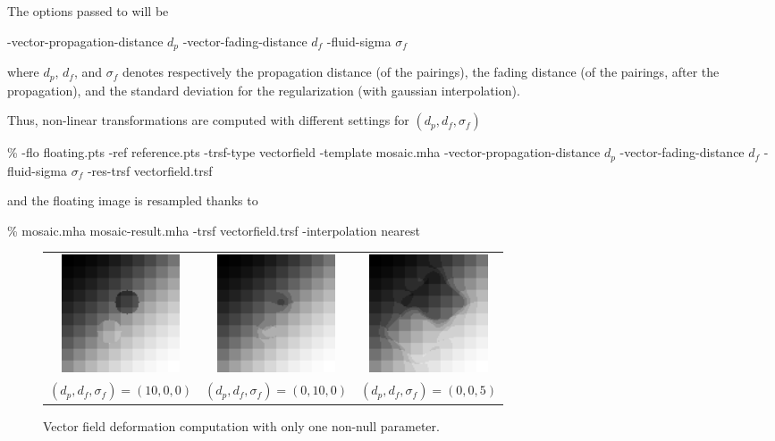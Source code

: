The options passed to \pointmatching will be
\begin{code}{1}
-vector-propagation-distance $d_p$
-vector-fading-distance $d_f$
-fluid-sigma $\sigma_f$
\end{code}
where $d_p$, $d_f$, and $\sigma_f$ denotes respectively the propagation distance (of the pairings), the fading distance (of the pairings, after the propagation), and the standard deviation for the regularization (with gaussian interpolation).

Thus, non-linear transformations are computed with different settings for $(d_p, d_f, \sigma_f)$
\begin{code}{1}
\% \pointmatching -flo floating.pts -ref reference.pts -trsf-type vectorfield 
  -template mosaic.mha 
  -vector-propagation-distance $d_p$ 
  -vector-fading-distance $d_f$ 
  -fluid-sigma $\sigma_f$ 
  -res-trsf vectorfield.trsf
\end{code}
and the floating image is resampled thanks to 

\begin{code}{1}
\% \applyTrsf mosaic.mha mosaic-result.mha -trsf vectorfield.trsf -interpolation nearest
\end{code}

\begin{figure}[ht]
\begin{center}
\begin{tabular}{ccc}
\includegraphics[width=35mm]{use-examples/pointmatching/mosaic-10-00-00.png} &
\includegraphics[width=35mm]{use-examples/pointmatching/mosaic-00-10-00.png} &
\includegraphics[width=35mm]{use-examples/pointmatching/mosaic-00-00-05.png} \\
$(d_p, d_f, \sigma_f) = (10,0,0)$ &
$(d_p, d_f, \sigma_f) = (0,10,0)$ &
$(d_p, d_f, \sigma_f) = (0,0,5)$ 
\end{tabular}
\end{center}
\caption{\label{fig:exe:pointmatching:2} Vector field deformation computation with only one non-null parameter.}
\end{figure}

